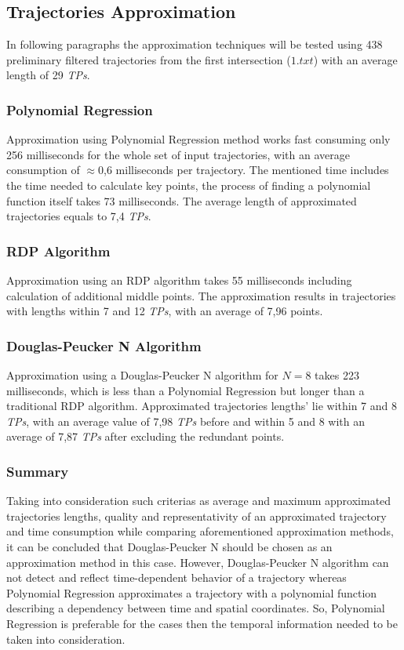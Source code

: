 \subsection{Trajectories Approximation}

In following paragraphs the approximation techniques will be tested using 438 preliminary filtered trajectories from the first intersection ($1.txt$) with an average length of 29 \textit{TPs}.

\subsubsection{Polynomial Regression}

Approximation using Polynomial Regression method works fast consuming only 256 milliseconds for the whole set of input trajectories, with an average consumption of $\approx$0,6 milliseconds per trajectory. The mentioned time includes the time needed to calculate key points, the process of finding a polynomial function itself takes 73 milliseconds. The average length of approximated trajectories equals to 7,4 \textit{TPs}.

\subsubsection{RDP Algorithm}

Approximation using an RDP algorithm takes 55 milliseconds including calculation of additional middle points. The approximation results in trajectories with lengths within 7 and 12 \textit{TPs}, with an average of 7,96 points.

\subsubsection{Douglas-Peucker N Algorithm}

Approximation using a Douglas-Peucker N algorithm for $N = 8$ takes 223 milliseconds, which is less than a Polynomial Regression but longer than a traditional RDP algorithm. Approximated trajectories lengths' lie within 7 and 8 \textit{TPs}, with an average value of 7,98 \textit{TPs} before and within 5 and 8 with an average of 7,87 \textit{TPs} after excluding the redundant points.

\subsubsection{Summary}

Taking into consideration such criterias as average and maximum approximated trajectories lengths, quality and representativity of an approximated trajectory and time consumption while comparing aforementioned approximation methods, it can be concluded that Douglas-Peucker N should be chosen as an approximation method in this case. However, Douglas-Peucker N algorithm can not detect and reflect time-dependent behavior of a trajectory whereas Polynomial Regression approximates a trajectory with a polynomial function describing a dependency between time and spatial coordinates. So, Polynomial Regression is preferable for the cases then the temporal information needed to be taken into consideration.



